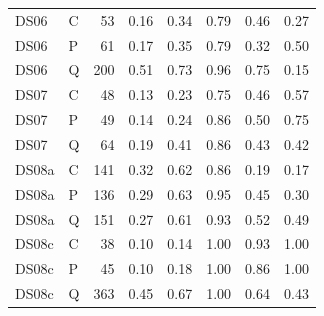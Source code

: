 \documentclass[10pt]{article}
\begin{document}
{\begin{longtable}{llrrrrrr}
\midrule
DS06 & C & 53 & 0.16 & 0.34 & 0.79 & 0.46 & 0.27 \\
DS06 & P & 61 & 0.17 & 0.35 & 0.79 & 0.32 & 0.50 \\
DS06 & Q & 200 & 0.51 & 0.73 & 0.96 & 0.75 & 0.15 \\
\midrule
DS07 & C & 48 & 0.13 & 0.23 & 0.75 & 0.46 & 0.57 \\
DS07 & P & 49 & 0.14 & 0.24 & 0.86 & 0.50 & 0.75 \\
DS07 & Q & 64 & 0.19 & 0.41 & 0.86 & 0.43 & 0.42 \\
\midrule
DS08a & C & 141 & 0.32 & 0.62 & 0.86 & 0.19 & 0.17 \\
DS08a & P & 136 & 0.29 & 0.63 & 0.95 & 0.45 & 0.30 \\
DS08a & Q & 151 & 0.27 & 0.61 & 0.93 & 0.52 & 0.49 \\
\midrule
DS08c & C & 38 & 0.10 & 0.14 & 1.00 & 0.93 & 1.00 \\
DS08c & P & 45 & 0.10 & 0.18 & 1.00 & 0.86 & 1.00 \\
DS08c & Q & 363 & 0.45 & 0.67 & 1.00 & 0.64 & 0.43 \\
\end{longtable}
\vspace{-0.6em}
}
\end{document}
